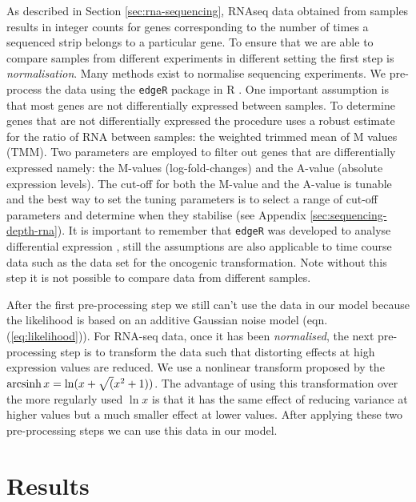 As described in Section \ref{sec:rna-sequencing}, RNAseq data obtained from samples results in integer counts for genes corresponding to the number of times a sequenced strip belongs to a particular gene. To ensure that we are able to compare samples from different experiments in different setting the first step is \emph{normalisation}. Many methods exist to normalise sequencing experiments. We pre-process the data using the \texttt{edgeR} package in R \citep{McCarthy:2012wg,Robinson:2010cw}. One important assumption is that most genes are not differentially expressed between samples. To determine genes that are not differentially expressed the procedure uses a robust estimate for the ratio of RNA between samples: the weighted trimmed mean of M values (TMM). Two parameters are employed to filter out genes that are differentially expressed namely: the M-values (log-fold-changes) and the A-value (absolute expression levels). The cut-off for both the M-value and the A-value is tunable and the best way to set the tuning parameters is to select a range of cut-off parameters and determine when they stabilise (see Appendix \ref{sec:sequencing-depth-rna}). It is important to remember that \texttt{edgeR} was developed to analyse differential expression \citep{Robinson:2010dd}, still the assumptions are also applicable to time course data such as the data set for the oncogenic transformation. Note without this step it is not possible to compare data from different samples.

After the first pre-processing step we still can't use the data in our model because the likelihood is based on an additive Gaussian noise model (eqn. (\ref{eq:likelihood})). For RNA-seq data, once it has been \emph{normalised}, the next pre-processing step is to transform the data such that distorting effects at high expression values are reduced. We use a nonlinear transform proposed by \cite{Hoffman:2012gn} the $\operatorname{arcsinh} x = \ln(x + \sqrt (x^2 + 1))$. The advantage of using this transformation over the more regularly used $\ln x$ is that it has the same effect of reducing variance at higher values but a much smaller effect at lower values. After applying these two pre-processing steps we can use this data in our model.

\section{Results}
\label{sec:results-mcf10a}

